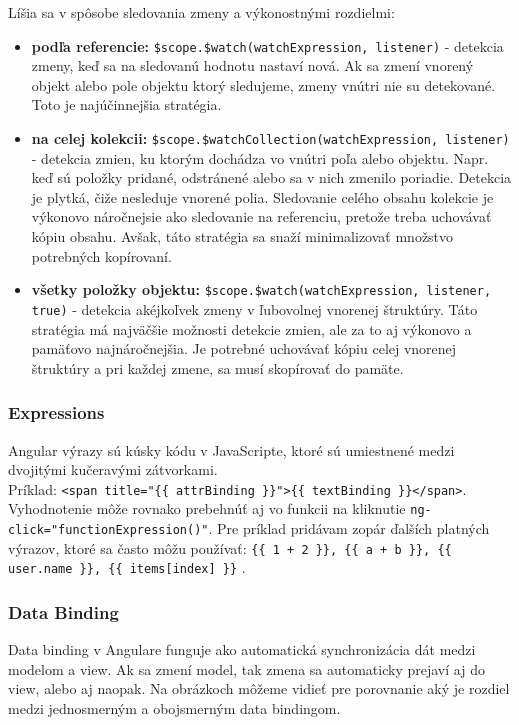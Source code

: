 \noindent Líšia sa v spôsobe sledovania zmeny a výkonostnými rozdielmi:
\begin{itemize}
  \item \textbf{podľa referencie:} \verb|$scope.$watch(watchExpression, listener)| - detekcia zmeny, keď sa na sledovanú hodnotu nastaví nová. Ak sa zmení vnorený objekt alebo pole objektu ktorý sledujeme, zmeny vnútri nie su detekované. Toto je najúčinnejšia stratégia.
  \item \textbf{na celej kolekcii:} \verb|$scope.$watchCollection(watchExpression, listener)| - detekcia zmien, ku ktorým dochádza vo vnútri poľa alebo objektu. Napr. keď sú položky pridané, odstránené alebo sa v nich zmenilo poriadie. Detekcia je plytká, čiže nesleduje vnorené polia. Sledovanie celého obsahu kolekcie je výkonovo náročnejsie ako sledovanie na referenciu, pretože treba uchovávať kópiu obsahu. Avšak, táto stratégia sa snaží minimalizovať množstvo potrebných kopírovaní.
  \item \textbf{všetky položky objektu:} \verb|$scope.$watch(watchExpression, listener, true)| - detekcia akéjkoľvek zmeny v ľubovolnej vnorenej štruktúry. Táto stratégia má najväčšie možnosti detekcie zmien, ale za to aj výkonovo a pamäťovo najnáročnejšia. Je potrebné uchovávať kópiu celej vnorenej štruktúry a pri každej zmene, sa musí skopírovať do pamäte.
\end{itemize}


\subsubsection{Expressions}
Angular výrazy sú kúsky kódu v JavaScripte, ktoré sú umiestnené medzi dvojitými kučeravými zátvorkami.\\
Príklad: \verb|<span title="{{ attrBinding }}">{{ textBinding }}</span>|. Vyhodnotenie môže rovnako prebehnúť aj vo funkcii na kliknutie \verb|ng-click="functionExpression()"|.
Pre príklad pridávam zopár ďalších platných výrazov, ktoré sa často môžu používať: \verb|{{ 1 + 2 }}, {{ a + b }}, {{ user.name }}, {{ items[index] }}| \cite{angular-docs}.





\subsubsection{Data Binding}
Data binding v Angulare funguje ako automatická synchronizácia dát medzi modelom a view. Ak sa zmení model, tak zmena sa automaticky prejaví aj do view, alebo aj naopak.
Na obrázkoch môžeme vidieť pre porovnanie aký je rozdiel medzi jednosmerným a obojsmerným data bindingom.

